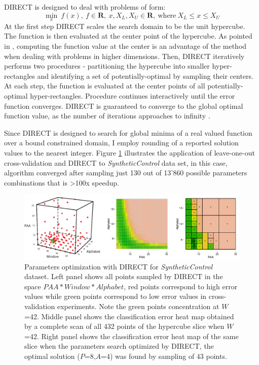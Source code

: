 DIRECT is designed to deal with problems of form:
\begin{equation}
 \min_{x} \: f(x), \: f \in \mathbf{R}, \: x, X_{L}, X_{U} \in \mathbf{R}, \: \text{where} \: X_{L} \leq x \leq X_{U}
 \label{formula:direct}
\end{equation} 
At the first step DIRECT scales the search domain to be the unit hypercube. The function is then evaluated 
at the center point of the hypercube. As pointed in \cite{citeulike:12563460}, computing the function value
at the center is an advantage of the method when dealing with problems
in higher dimensions.
Then, DIRECT iteratively performs two procedures - partitioning the hypercube into smaller hyper-rectangles 
and identifying a set of potentially-optimal by sampling their centers. At each step, the function is evaluated 
at the center points of all potentially-optimal hyper-rectangles. Procedure continues interactively until the 
error function converges. DIRECT is guaranteed to converge to the global optimal function value,
as the number of iterations approaches to infinity \cite{citeulike:12563460}.

Since DIRECT is designed to search for global minima of a real valued function over 
a bound constrained domain, I employ rounding of a reported solution values to the nearest integer.
Figure \ref{fig:direct-sampling} illustrates the application of leave-one-out cross-validation and DIRECT to 
\textit{SyntheticControl} data set, in this case, algorithm converged after sampling just 130 out of 13'860 
possible parameters combinations that is \textgreater100x speedup.

\begin{figure}[t]
   \centering
   \includegraphics[width=150mm]{figures/figure_direct.eps}
   \caption{Parameters optimization with DIRECT for \textit{SyntheticControl} dataset. 
   Left panel shows all points sampled by DIRECT in the space \mbox{$PAA*Window*Alphabet$},
   red points correspond to high error values while green points correspond to low error values 
   in cross-validation experiments. 
   Note the green points concentration at $W$=42. 
   Middle panel shows the classification error heat map obtained by a complete scan 
   of all 432 points of the hypercube slice when $W$=42. 
   Right panel shows the classification error heat map of the same slice when 
   the parameters search optimized by DIRECT, 
   the optimal solution ($P$=8,$A$=4) was found by sampling of 43 points.}
   \label{fig:direct-sampling}
\end{figure}


